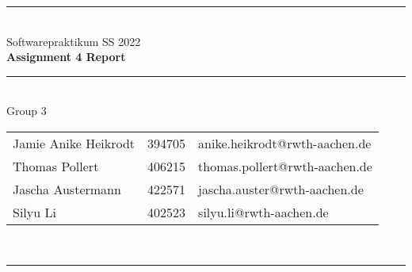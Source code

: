 \documentclass[a4paper,12pt]{article}
\begin{document}
\begin{center}
	\rule{\textwidth}{0.1pt}\\[1cm]
	
	\Large Softwarepraktikum SS 2022\\\bf Assignment 4 Report %
\end{center}


\begin{center}

	\rule{\textwidth}{0.1pt}\\[0.5cm]

	{\Large Group 3\\[5mm]} %

	\begin{tabular}{lll}
		Jamie Anike Heikrodt & 394705 & anike.heikrodt@rwth-aachen.de \\

		Thomas Pollert & 406215 & thomas.pollert@rwth-aachen.de \\
		
		Jascha Austermann & 422571 & jascha.auster@rwth-aachen.de \\

		Silyu Li & 402523 & silyu.li@rwth-aachen.de \\

	\end{tabular}\\[0.5cm]

	\rule{\textwidth}{0.1pt}\\[1cm]
	
\end{center}

\newpage
\tableofcontents





\end{document}
